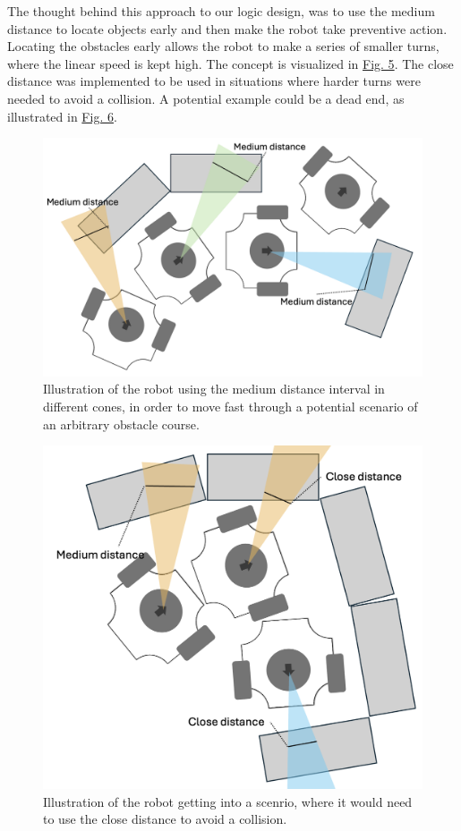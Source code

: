 \documentclass[conference]{IEEEtran}
\begin{document}
The thought behind this approach to our logic design, was to use the medium distance to locate objects early and then make the robot take preventive action.
Locating the obstacles early allows the robot to make a series of smaller turns, where the linear speed is kept high. The concept is visualized in \href{sec:medium aviodance}{Fig. 5}.
The close distance was implemented to be used in situations where harder turns were needed to avoid a collision. A potential example could be a dead end, as illustrated in \href{sec:close aviodance}{Fig. 6}.
\begin{figure}[htbp]
    \centerline{\includegraphics[width=1.0\columnwidth]{Pictures/Medium Distance Aviodance.png}}
    \caption{Illustration of the robot using the medium distance interval in different cones, in order to move fast through a potential scenario of an arbitrary obstacle course.}
    \label{sec:medium aviodance}
    \end{figure}
\begin{figure}[htbp]
    \centerline{\includegraphics[width=1.0\columnwidth]{Pictures/Close Distance Avoidance.png}}
    \caption{Illustration of the robot getting into a scenrio, where it would need to use the close distance to avoid a collision.}
    \label{sec:close aviodance}
    \end{figure}
\end{document}
